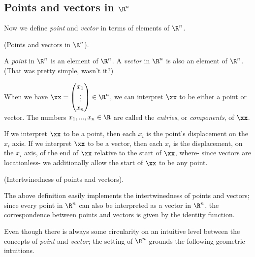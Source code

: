 \newpage

\subsection*{Points and vectors in $\R^n$}

Now we define \textit{point} and \textit{vector} in terms of elements of $\R^n$.

\begin{defn}
    (Points and vectors in $\R^n$).
    
    A \textit{point} in $\R^n$ is an element of $\R^n$. A \textit{vector} in $\R^n$ is also an element of $\R^n$. (That was pretty simple, wasn't it?)
    
    When we have $\xx = \begin{pmatrix} x_1 \\ \vdots \\ x_n \end{pmatrix} \in \R^n$, we can interpret $\xx$ to be either a point or vector. The numbers $x_1, ..., x_n \in \R$ are called the \textit{entries}, or \textit{components}, of $\xx$.
    
    If we interpret $\xx$ to be a point, then each $x_i$ is the point's displacement on the $x_i$ axis. If we interpret $\xx$ to be a vector, then each $x_i$ is the displacement, on the $x_i$ axis, of the end of $\xx$ relative to the start of $\xx$, where- since vectors are locationless- we additionally allow the start of $\xx$ to be any point.
\end{defn}

\begin{remark}
    (Intertwinedness of points and vectors).
    
    The above definition easily implements the intertwinedness of points and vectors; since every point in $\R^n$ can also be interpreted as a vector in $\R^n$, the correspondence between points and vectors is given by the identity function.
\end{remark}

Even though there is always some circularity on an intuitive level between the concepts of \textit{point} and \textit{vector}; the setting of $\R^n$ grounds the following geometric intuitions.

